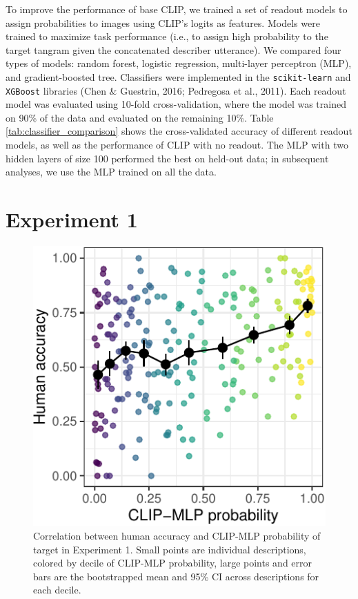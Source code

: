 \documentclass[10pt, letterpaper]{article}
\begin{document}
To improve the performance of base CLIP, we trained a set of readout
models to assign probabilities to images using CLIP's logits as
features. Models were trained to maximize task performance (i.e., to
assign high probability to the target tangram given the concatenated
describer utterance). We compared four types of models: random forest,
logistic regression, multi-layer perceptron (MLP), and gradient-boosted
tree. Classifiers were implemented in the \texttt{scikit-learn} and
\texttt{XGBoost} libraries (Chen \& Guestrin, 2016; Pedregosa et al.,
2011). Each readout model was evaluated using 10-fold cross-validation,
where the model was trained on 90\% of the data and evaluated on the
remaining 10\%. Table \ref{tab:classifier_comparison} shows the
cross-validated accuracy of different readout models, as well as the
performance of CLIP with no readout. The MLP with two hidden layers of
size 100 performed the best on held-out data; in subsequent analyses, we
use the MLP trained on all the data.

\section{Experiment 1}\label{experiment-1}

\begin{CodeChunk}
\begin{figure}[t]

{\centering \includegraphics[width=0.7\linewidth]{figs/fig-calibration-1} 

}

\caption[Correlation between human accuracy and CLIP-MLP probability of target in Experiment 1]{Correlation between human accuracy and CLIP-MLP probability of target in Experiment 1.  Small points are individual descriptions, colored by decile of CLIP-MLP probability, large points and error bars are the bootstrapped mean and 95\% CI across descriptions for each decile. \label{calibration}}\label{fig:fig-calibration}
\end{figure}
\end{CodeChunk}
\end{document}
